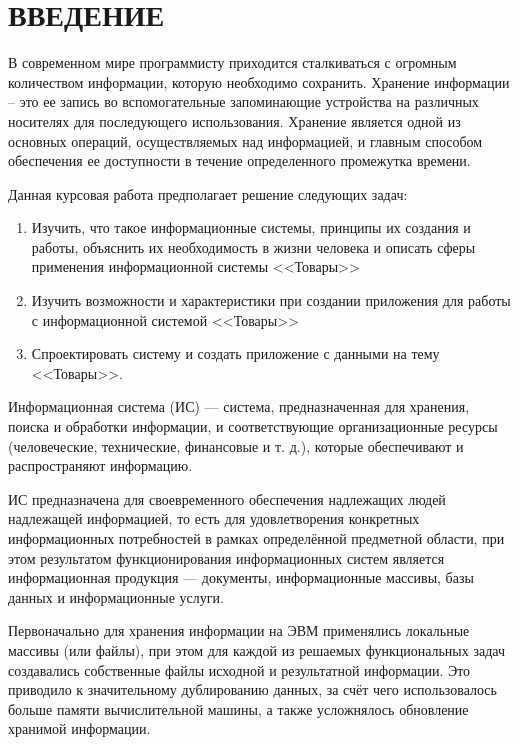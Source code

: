 \section*{ВВЕДЕНИЕ} %

В современном мире программисту приходится сталкиваться с огромным количеством информации, которую необходимо сохранить. Хранение информации – это ее запись во вспомогательные запоминающие устройства на различных носителях для последующего использования. Хранение является одной из основных операций, осуществляемых над информацией, и главным способом обеспечения ее доступности в течение определенного промежутка времени.

Данная курсовая работа предполагает решение следующих задач:

\begin{enumerate}
    \item Изучить, что такое информационные системы, принципы их создания и работы, объяснить их необходимость в жизни человека и описать сферы применения информационной системы <<Товары>>
    \item Изучить возможности и характеристики при создании приложения для работы с информационной системой <<Товары>>
    \item Спроектировать систему и создать приложение с данными на тему <<Товары>>.
\end{enumerate}

Информационная система (ИС) — система, предназначенная для хранения, поиска и обработки информации, и соответствующие организационные ресурсы (человеческие, технические, финансовые и т. д.), которые обеспечивают и распространяют информацию.

ИС предназначена для своевременного обеспечения надлежащих людей надлежащей информацией, то есть для удовлетворения конкретных информационных потребностей в рамках определённой предметной области, при этом результатом функционирования информационных систем является информационная продукция — документы, информационные массивы, базы данных и информационные услуги.

Первоначально для хранения информации на ЭВМ применялись локальные массивы (или файлы), при этом для каждой из решаемых функциональных задач создавались собственные файлы исходной и результатной информации. Это приводило к значительному дублированию данных, за счёт чего использовалось больше памяти вычислительной машины, а также усложнялось обновление хранимой информации.

